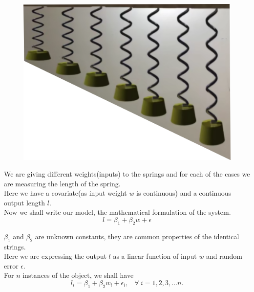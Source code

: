 \documentclass[11pt, a4paper]{article}\usepackage[]{graphicx}\usepackage[]{xcolor}
\begin{document}
\begin{figure}[h]
	\centering
	\includegraphics[scale = 0.15]{download}\\
\end{figure}

We are giving different weights(inputs) to the springs and for each of the cases we are measuring the length of the spring. \\
Here we have a covariate(as input weight $w$ is continuous) and a continuous output length $l$.\\

Now we shall write our model, the mathematical formulation of the system. \\

$$l = \beta_1 + \beta_2 w + \epsilon$$

$\beta_1$ and $\beta_2$ are unknown constants, they are common properties of the identical strings.\\

Here we are expressing the output $l$ as a linear function of input $w$ and random error $\epsilon$.\\

For $n$ instances of the object, we shall have $$l_i = \beta_1 + \beta_2 w_i + \epsilon_i, \hspace{10pt} \forall \hspace{3pt} i = 1, 2, 3, \ldots n.$$
\end{document}

